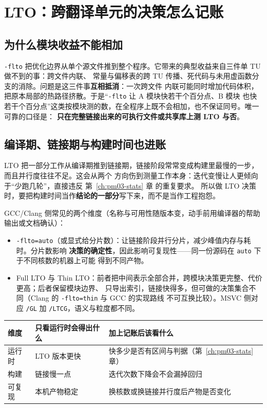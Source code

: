 \documentclass[12pt,a4paper,fontset=fandol]{ctexbook}
\newcommand{\Tp}[1]{\texttt{#1}}
\begin{document}
\section{LTO：跨翻译单元的决策怎么记账}
\label{sec:pm10-lto}

\subsection{为什么模块收益不能相加}

\Tp{-flto} 把优化边界从单个源文件推到整个程序。它带来的典型收益来自三件单 TU 做不到的事：跨文件内联、
常量与偏移表的跨 TU 传播、死代码与未用虚函数分支的消除。问题是这三件事\textbf{互相抵消}：一次跨文件
内联可能同时增加代码体积，把原本局部的热路径挤散。于是``\Tp{-flto} 让 A 模块快若干个百分点、B 模块
也快若干个百分点''这类按模块测的数，在全程序上既不会相加，也不保证同号。唯一可靠的口径是：
\textbf{只在完整链接出来的可执行文件或共享库上测 LTO 与否}。

\subsection{编译期、链接期与构建时间也进账}

LTO 把一部分工作从编译期推到链接期，链接阶段常常变成构建里最慢的一步，而且并行度往往不足。这会从两个
方向伤到测量工作本身：迭代变慢让人更倾向于``少跑几轮''，直接违反 第~\ref{ch:pm03-stats} 章 的重复要求。
所以做 LTO 决策时，要把构建时间当作\textbf{结论的一部分}写下来，而不是当作工程抱怨。

GCC/Clang 侧常见的两个维度（名称与可用性随版本变，动手前用编译器的帮助输出或文档确认）：

\begin{itemize}
  \item \Tp{-flto=auto}（或显式给分片数）：让链接阶段并行分片，减少峰值内存与耗时。分片数影响
        \textbf{决策的确定性}，因此影响可复现性——同一份源码在 \Tp{auto} 下于不同核数的机器上可能
        得到不同产物。
  \item Full LTO 与 Thin LTO：前者把中间表示全部合并，跨模块决策更完整、代价更高；后者保留模块边界、
        只导出索引，链接快得多，但可做的决策集合不同（Clang 的 \Tp{-flto=thin} 与 GCC 的实现路线
        不可互换比较）。MSVC 侧对应 \Tp{/GL} 加 \Tp{/LTCG}，语义与粒度都不同。
\end{itemize}

\begin{compare}[title={要不要上 LTO：三笔账一起记}]
\begin{tabular}{>{\raggedright\arraybackslash}p{} >{\raggedright\arraybackslash}p{} >{\raggedright\arraybackslash}p{}}
\toprule
维度 & 只看运行时会得出什么 & 加上记账后该看什么 \\
\midrule
运行时 & LTO 版本更快 & 快多少是否有区间与判据（第~\ref{ch:pm03-stats} 章） \\
构建 & 链接慢一点 & 迭代次数下降会不会漏掉回归 \\
可复现 & 本机产物稳定 & 换核数或换链接并行度后产物是否变化 \\
\bottomrule
\end{tabular}
\end{compare}
\end{document}
